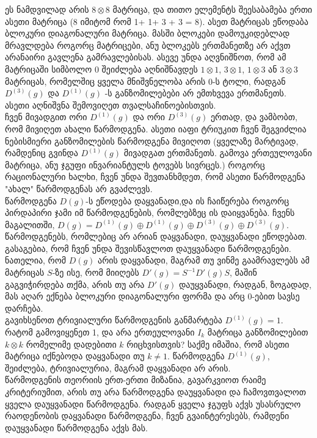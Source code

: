 \documentclass[12pt]{article}
\begin{document}
\begin{sloppypar}
ეს ნამდვილად არის $8\otimes 8$ მატრიცა, და თითო ელემენტს შეესაბამება ერთი ასეთი მატრიცა (8 იმიტომ რომ 1+ 1+ 3 + 3 = 8). ასეთ მატრიცას ეწოდაბა ბლოკური დიაგონალური მატრიცა. მასში ბლოკები დამოუკიდებლად მრავლდება როგორც მატრიცები, ანუ ბლოკებს ერთმანეთზე არ აქვთ არანაირი გავლენა გამრავლებისას. ასევე უნდა აღვნიშნოთ, რომ ამ მატრიცაში სიმბოლო 0 შეიძლება აღნიშნავდეს $1\otimes 1$, $3\otimes 1$, $1\otimes 3$ ან $3\otimes 3$ მატრიცას, რომელშიც ყველა მნიშვნელობა არის 0-ს ტოლი, რადგან $D^{(3)}(g)$ და $D^{(1)}(g)$ -ს განზომილებები არ ემთხვევა ერთმანეთს. ასეთი აღნიშვნა შემოვიღეთ თვალსაჩინოებისთვის. \\

ჩვენ მივადგით ორი $D^{(1)}(g)$ და ორი $D^{(3)}(g)$ ერთად, და ვამბობთ, რომ მივიღეთ ახალი წარმოდგენა. ასეთი იაფი ტრიუკით ჩვენ შეგვიძლია ნებისმიერი განზომილების წარმოდგენა მივიღოთ (ყველაზე მარტივად, რამდენიც გვინდა $D^{(1)}(g)$ მივადგათ ერთმანეთს. გამოვა ერთეულოვანი მატრიცა, ანუ ჯგუფი ინვარიანტულს ტოვებს სივრცეს.) როგორც რაციონალური ხალხი, ჩვენ უნდა შევთანხმდეთ, რომ ასეთი წარმოდგენა "ახალ" წარმოდგენას არ გვაძლევს. \\

წარმოდგენა $D(g)$-ს ეწოდება დაყვანადი,და ის ჩაიწერება როგორც პირდაპირი ჯამი იმ წარმოდგენების, რომლებზეც ის დაიყვანება. ჩვენს მაგალითში, $D(g) = D^{(1)}(g)  \oplus  D^{(1)}(g)  \oplus D^{(3)}(g)   \oplus D^{(3)}(g)$.\\

წარმოდგენებს, რომლებიც არ არიან დაყვანადი, დაუყვანადი ეწოდებათ. გასაგებია, რომ ჩვენ უნდა შევისწავლოთ დაუყვანადი წარმოდგენები. \\

ნათელია, რომ $D(g)$ არის დაყვანადი, მაგრამ თუ ვინმე გაამრავლებს ამ მატრიცას $S$-ზე ისე, რომ მიიღებს $D'(g) = S^{-1}D'(g)S$, მაშინ გაგვიჭირდება თქმა, არის თუ არა $D'(g)$ დაუყვანადი, რადგან, ზოგადად, მას აღარ ექნება ბლოკური დიაგონალური ფორმა და არც 0-ებით სავსე დარჩება.\\

გავიხსენოთ ტრივიალური წარმოდგენის განმარტება $D^{(1)}(g) = 1$. რატომ გამოვიყენეთ 1, და არა ერთეულოვანი $I_k$ მატრიცა განზომილებით $k\otimes k$ რომელიმე დადებითი $k$ რიცხვისთვის? საქმე იმაშია, რომ ასეთი მატრიცა იქნებოდა დაყვანადი თუ $k \neq 1$. წარმოდგენა $D^{(1)}(g)$, შეიძლება, ტრივიალურია, მაგრამ დაყვანადი არ არის.\\

წარმოდგენის თეორიის ერთ-ერთი მიზანია, გავარკვიოთ რაიმე კრიტერიუმით, არის თუ არა წარმოდგენა დაუყვანადი და ჩამოვთვალოთ ყველა დაუყვანადი წარმოდგენა. რადგან ყველა ჯგუფს აქვს უსასრულო რაოდენობის დაყვანადი წარმოდგენა, ჩვენ გვაინტერესებს, რამდენი დაუყვანადი წარმოდგენა აქვს მას.


\end{sloppypar}
\end{document}
